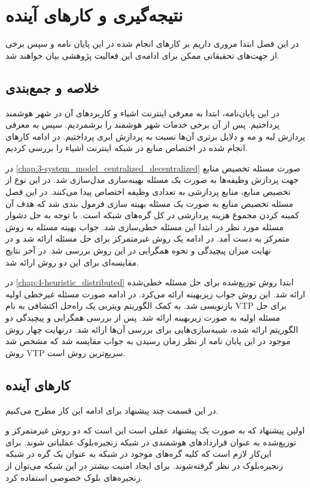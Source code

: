 \chapter{نتیجه‌گیری و کار‌های آینده}\label{chap:conclusion}
  \thispagestyle{empty}
  در این فصل ابتدا مروری داریم بر کار‌های انجام شده در این پایان نامه و سپس برخی از جهت‌های تحقیقاتی ممکن برای ادامه‌ی این فعالیت پژوهشی بیان خواهند شد.

  \section{خلاصه و جمع‌بندی}
    در این پایان‌نامه، ابتدا به معرفی اینترنت اشیاء و کاربرد‌های آن در شهر هوشمند پرداختیم.
    پس از آن برخی خدمات شهر هوشمند را برشمردیم.
    سپس به معرفی پردازش لبه و مه و دلایل برتری آن‌ها نسبت به پردازش ابری پرداختیم.
    در ادامه کار‌های انجام شده در اختصاص منابع در شبکه اینترنت اشیاء را بررسی کردیم.

    در \cref{chap:3-system_model_centralized_decentralized} صورت مسئله تخصیص منابع جهت پردازش وظیفه‌ها به صورت یک مسئله بهینه‌سازی مدل‌سازی شد. 
    در این نوع از تخصیص منابع، منابع پردازشی به تعدادی وظیفه اختصاص پیدا می‌کنند.
    در این فصل مسئله تخصیص منابع به صورت یک مسئله بهینه سازی فرمول بندی شد که هدف آن کمینه کردن مجموع هزینه پردازشی در کل گره‌های شبکه است.
    با توجه به حل دشوار مسئله مورد نظر در ابتدا این مسئله خطی‌سازی شد. جواب بهینه مسئله به روش متمرکز به دست آمد.
    در ادامه یک روش غیرمتمرکز برای حل مسئله ارائه شد و در نهایت میزان پیچیدگی و نحوه همگرایی در این روش بررسی شد. در آخر نتایج مقایسه‌ای برای این دو روش ارائه شد.

    در \cref{chap:4-heuristic_distributed} ابتدا روش توزیع‌شده برای حل مسئله خطی‌‌شده ارائه شد. این روش جواب زیربهینه ارائه می‌کرد.
    در ادامه صورت مسئله غیرخطی اولیه بازنویسی شد.
    به کمک الگوریتم ویتربی یک راه‌حل اکتشافی به نام VTP برای حل مسئله اولیه به صورت زیر‌بهینه ارائه شد.
    پس از بررسی همگرایی و پیچیدگی دو الگوریتم ارائه شده، شبیه‌سازی‌هایی برای بررسی آن‌ها ارائه شد.
    درنهایت چهار روش موجود در این پایان نامه از نظر زمان رسیدن به جواب مقایسه شد که مشخص شد روش VTP سریع‌ترین روش است. 

  \section{کار‌های آینده}
    در این قسمت چند پیشنهاد برای ادامه این کار مطرح می‌کنیم.
  
  اولین پیشنهاد که به صورت یک پیشنهاد عملی است این است که دو روش غیرمتمرکز و توزیع‌شده به عنوان قراردادهای هوشمندی در شبکه زنجیره‌‌بلوک عملیاتی شوند. برای این‌کار لازم است که کلیه گره‌های موجود در شبکه به عنوان یک گره در شبکه زنجیره‌بلوک در نظر گرفته‌شوند. برای ایجاد امنیت بیشتر در این شبکه می‌توان از زنجیره‌های بلوک خصوصی استفاده کرد.
  
